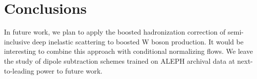 \section{Conclusions}\label{sec:conclusions}

In future work, we plan to apply the boosted hadronization correction of
semi-inclusive deep inelastic scattering to boosted W boson production.
It would be interesting to combine this approach with conditional
normalizing flows. We leave the study of dipole subtraction schemes
trained on ALEPH archival data at next-to-leading power to future work.

